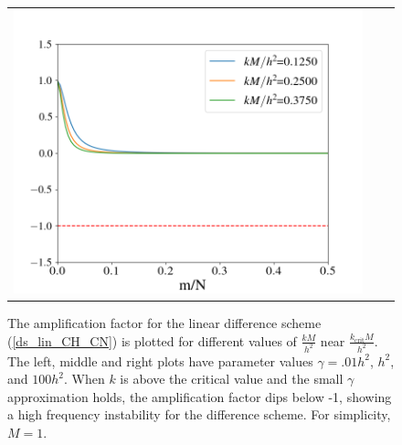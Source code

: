 \documentclass[12pt, reqno]{report}
\theoremstyle{definition}
\theoremstyle{remark}
\begin{document}
\begin{figure}[H]
\begin{tabular}{ccc}
        \includegraphics[width = \ampwidth]{media_paper/ga100_CH_CN.png}
    \end{tabular}

    \caption{The amplification factor for the linear difference scheme (\ref{ds_lin_CH_CN}) is plotted for different values of $\frac{kM}{h^2}$ near $\frac{k_\text{crit}M}{h^2}$.  The left, middle and right plots have parameter values $\gamma=.01h^2$, $h^2$, and $100h^2$. When $k$ is above the critical value and the small $\gamma$ approximation holds, the amplification factor dips below -1, showing a high frequency instability for the difference scheme. For simplicity, $M=1$.}
    \label{fg_CH_amp_CN}
\end{figure}
\end{document}
